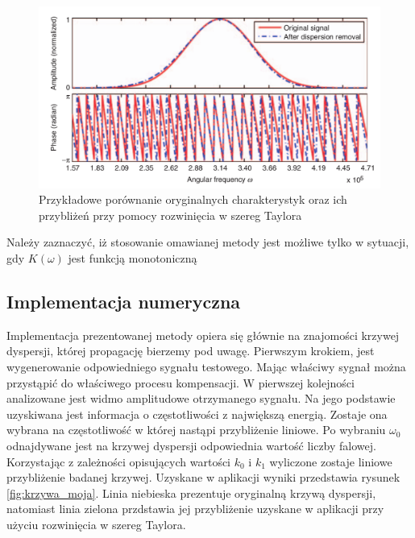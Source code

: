 \begin{figure}[h]
\centering
\includegraphics[width=14cm]{Zdjecia/4/widma}
\caption{Przykładowe porównanie oryginalnych charakterystyk oraz ich przybliżeń przy pomocy rozwinięcia w szereg Taylora}
\label{fig:widma}
\end{figure}

Należy zaznaczyć, iż stosowanie omawianej metody jest możliwe tylko w sytuacji, gdy $K(\omega)$ jest funkcją monotoniczną

\subsection{Implementacja numeryczna}
Implementacja prezentowanej metody opiera się głównie na znajomości krzywej dyspersji, której propagację bierzemy pod uwagę. Pierwszym krokiem, jest wygenerowanie odpowiedniego sygnału testowego. Mając właściwy sygnał można przystąpić do właściwego procesu kompensacji. W pierwszej kolejności analizowane jest widmo amplitudowe otrzymanego sygnału. Na jego podstawie uzyskiwana jest informacja o częstotliwości z największą energią. Zostaje ona wybrana na częstotliwość w której nastąpi przybliżenie liniowe. Po wybraniu $\omega _0$ odnajdywane jest na krzywej dyspersji odpowiednia wartość liczby falowej. Korzystając z zależności opisujących wartości $k_0$ i $k_1$ wyliczone zostaje liniowe przybliżenie badanej krzywej. Uzyskane w aplikacji wyniki przedstawia rysunek \ref{fig:krzywa_moja}. Linia niebieska prezentuje oryginalną krzywą dyspersji, natomiast linia zielona przdstawia jej przybliżenie uzyskane w aplikacji przy użyciu rozwinięcia w szereg Taylora.

